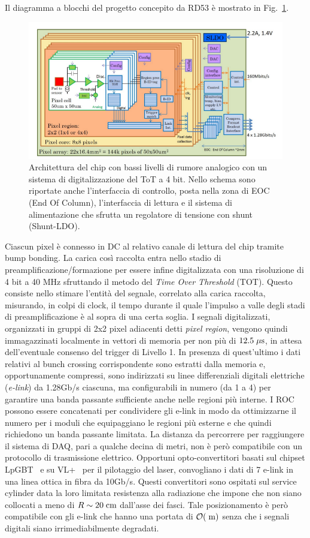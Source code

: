 Il diagramma a blocchi del progetto concepito da RD53 è mostrato in Fig.~\ref{ChipBlockDiagram}. 
\begin{figure}
\centering
\includegraphics[scale=0.4]{Immagini/ChipBlockDiagram}
\caption{Architettura del chip con bassi livelli di rumore analogico con un sistema di digitalizzazione del ToT a 4 bit. Nello schema sono riportate anche l'interfaccia di controllo, posta nella zona di EOC (End Of Column), l'interfaccia di lettura e il sistema di alimentazione che sfrutta un regolatore di tensione con shunt (Shunt-LDO).}
\label{ChipBlockDiagram}
\end{figure}
Ciascun pixel \`e connesso in DC al relativo canale di lettura del chip tramite bump bonding. La carica cos\`i raccolta entra nello stadio di preamplificazione/formazione per essere infine digitalizzata con una risoluzione di 4 bit a 40 MHz sfruttando il metodo del {\em Time Over Threshold} (TOT). Questo consiste nello stimare l'entit\`a del segnale, correlato alla carica raccolta, misurando, in colpi di clock, il tempo durante il quale l'impulso a valle degli stadi di preamplificazione è al sopra di una certa soglia. I segnali digitalizzati, organizzati in gruppi di 2x2 pixel adiacenti detti {\em pixel region}, vengono quindi immagazzinati localmente in vettori di memoria per non pi\`u di $12.5\; \mu \rm s$, in attesa dell'eventuale consenso del trigger di Livello 1. In presenza di quest'ultimo i dati relativi al bunch crossing corrispondente sono estratti dalla memoria e, opportunamente compressi, sono indirizzati su linee differenziali digitali elettriche ({\em e-link}) da 1.28Gb/s ciascuna, ma configurabili in numero (da 1 a 4) per garantire una banda passante sufficiente anche nelle regioni pi\`u interne. I ROC possono essere concatenati per condividere gli e-link in modo da ottimizzarne il numero per i moduli che equipaggiano le regioni pi\`u esterne e che quindi richiedono un banda passante limitata. La distanza da percorrere per raggiungere il sistema di DAQ, pari a qualche decina di metri, non \`e per\`o compatibile con un protocollo di trasmissione elettrico. Opportuni opto-convertitori basati sul chipset LpGBT~\cite{LpGBT} e su VL+~\cite{VL} per il pilotaggio del laser, convogliano i dati di 7 e-link in una linea ottica in fibra da 10Gb/s. Questi convertitori sono ospitati sul service cylinder data la loro limitata resistenza alla radiazione che impone che non siano collocati a meno di $R\sim20\rm \; cm$ dall'asse dei fasci. Tale posizionamento \`e per\`o compatibile con gli e-link che hanno una portata di ${\cal O}(\rm \; m)$ senza che i segnali digitali siano irrimediabilmente degradati.
